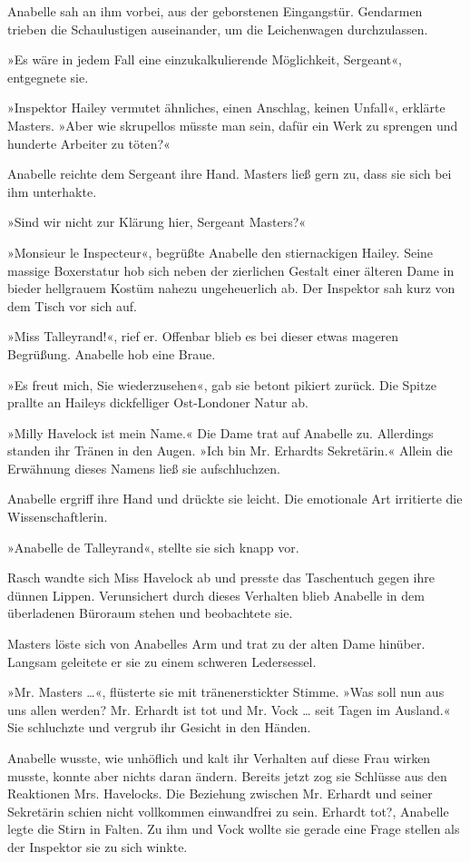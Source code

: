Anabelle sah an ihm vorbei, aus der geborstenen Eingangstür.
Gendarmen trieben die Schaulustigen auseinander, um die
Leichenwagen durchzulassen.

»Es wäre in jedem Fall eine einzukalkulierende Möglichkeit,
Sergeant«, entgegnete sie.

»Inspektor Hailey vermutet ähnliches, einen Anschlag, keinen
Unfall«, erklärte Masters. »Aber wie skrupellos müsste man sein,
dafür ein Werk zu sprengen und hunderte Arbeiter zu töten?«

Anabelle reichte dem Sergeant ihre Hand. Masters ließ gern zu, dass
sie sich bei ihm unterhakte.

»Sind wir nicht zur Klärung hier, Sergeant Masters?«

\tb

»Monsieur le Inspecteur«, begrüßte Anabelle den stiernackigen
Hailey. Seine massige Boxerstatur hob sich neben der zierlichen
Gestalt einer älteren Dame in bieder hellgrauem Kostüm nahezu
ungeheuerlich ab. Der Inspektor sah kurz von dem Tisch vor sich
auf.

»Miss Talleyrand!«, rief er. Offenbar blieb es bei dieser etwas
mageren Begrüßung. Anabelle hob eine Braue.

»Es freut mich, Sie wiederzusehen«, gab sie betont pikiert zurück.
Die Spitze prallte an Haileys dickfelliger Ost-Londoner Natur ab.

»Milly Havelock ist mein Name.« Die Dame trat auf Anabelle zu.
Allerdings standen ihr Tränen in den Augen. »Ich bin Mr. Erhardts
Sekretärin.« Allein die Erwähnung dieses Namens ließ sie
aufschluchzen.

Anabelle ergriff ihre Hand und drückte sie leicht. Die emotionale
Art irritierte die Wissenschaftlerin.

»Anabelle de Talleyrand«, stellte sie sich knapp vor.

Rasch wandte sich Miss Havelock ab und presste das Taschentuch
gegen ihre dünnen Lippen. Verunsichert durch dieses Verhalten blieb
Anabelle in dem überladenen Büroraum stehen und beobachtete sie.

Masters löste sich von Anabelles Arm und trat zu der alten Dame
hinüber. Langsam geleitete er sie zu einem schweren Ledersessel.

»Mr. Masters …«, flüsterte sie mit tränenerstickter Stimme. »Was
soll nun aus uns allen werden? Mr. Erhardt ist tot und Mr. Vock …
seit Tagen im Ausland.« Sie schluchzte und vergrub ihr Gesicht in
den Händen.

Anabelle wusste, wie unhöflich und kalt ihr Verhalten auf diese
Frau wirken musste, konnte aber nichts daran ändern. Bereits jetzt
zog sie Schlüsse aus den Reaktionen Mrs. Havelocks. Die Beziehung
zwischen Mr. Erhardt und seiner Sekretärin schien nicht vollkommen
einwandfrei zu sein. Erhardt tot?, Anabelle legte die Stirn in
Falten. Zu ihm und Vock wollte sie gerade eine Frage stellen als
der Inspektor sie zu sich winkte.


